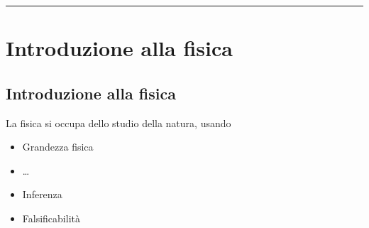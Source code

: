 \documentclass[letterpaper,10pt,italian]{jupyterBook}
\begin{document}
\bigskip\hrule\bigskip


\sphinxstepscope


\part{Introduzione alla fisica}

\sphinxstepscope


\chapter{Introduzione alla fisica}
\label{\detokenize{ch/intro:introduzione-alla-fisica}}\label{\detokenize{ch/intro:physics-hs-intro}}\label{\detokenize{ch/intro::doc}}
\sphinxAtStartPar
La fisica si occupa dello studio della natura, usando

\sphinxAtStartPar
{}
\begin{itemize}
\item {} 
\sphinxAtStartPar
Grandezza fisica

\item {} 
\sphinxAtStartPar
…

\end{itemize}

\sphinxAtStartPar
{}
\begin{itemize}
\item {} 
\sphinxAtStartPar
Inferenza

\item {} 
\sphinxAtStartPar
Falsificabilità

\end{itemize}
\end{document}
